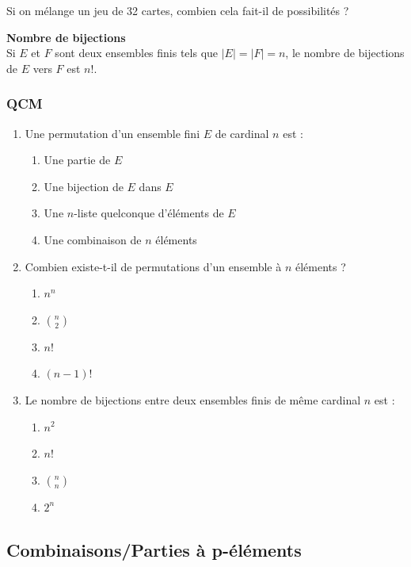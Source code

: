 \documentclass[../PolyS4.tex]{subfiles}
\begin{document}
\begin{Ex}Si on mélange un jeu de 32 cartes, combien cela fait-il de possibilités ?
\end{Ex}

\begin{Prop}\textbf{Nombre de bijections}\\
Si \( E \) et \( F \) sont deux ensembles finis tels que \( |E| = |F| = n \), le nombre de bijections de \( E \) vers \( F \) est \( n! \).\\
\end{Prop}

\subsubsection*{QCM}

\begin{enumerate}
\item Une permutation d'un ensemble fini $E$ de cardinal $n$ est :
\begin{enumerate}
\item Une partie de $E$
\item Une bijection de $E$ dans $E$
\item Une $n$-liste quelconque d'éléments de $E$
\item Une combinaison de $n$ éléments
\end{enumerate}

\item Combien existe-t-il de permutations d'un ensemble à $n$ éléments ?
\begin{enumerate}
\item $n^n$
\item $\binom{n}{2}$
\item $n!$
\item $(n-1)!$
\end{enumerate}

\item Le nombre de bijections entre deux ensembles finis de même cardinal $n$ est :
\begin{enumerate}
\item $n^2$
\item $n!$
\item $\binom{n}{n}$
\item $2^n$
\end{enumerate}
\end{enumerate}

\subsection{Combinaisons/Parties à p-éléments}
\end{document}

